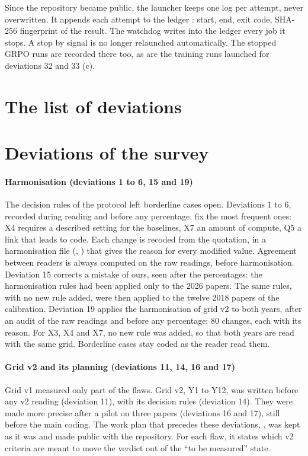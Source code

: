 Since the repository became public, the launcher  keeps one log per attempt, never overwritten. It
appends each attempt to the ledger : start, end, exit code, SHA-256
fingerprint of the result. The watchdog writes into the ledger every job it stops. A stop by signal
is no longer relaunched automatically. The stopped GRPO runs are recorded there too, as are the
training runs launched for deviations 32 and 33 (c).

\section{The list of deviations}
\label{sec:liste-ecarts}


\section{Deviations of the survey}
\label{sec:ecarts-sondage}

\paragraph{Harmonisation (deviations 1 to 6, 15 and 19)} The decision rules of the protocol left
borderline cases open. Deviations 1 to 6, recorded during reading and before any percentage, fix
the most frequent ones: X4 requires a described setting for the baselines, X7 an amount of compute,
Q5 a link that leads to code. Each change is recoded from the quotation, in a harmonisation file
(, ) that gives the reason for every modified value.
Agreement between readers is always computed on the raw readings, before harmonisation. Deviation 15
corrects a mistake of ours, seen after the percentages: the harmonisation rules had been applied
only to the 2026 papers. The same rules, with no new rule added, were then applied to the twelve
2018 papers of the calibration. Deviation 19 applies the harmonisation of grid v2 to both years,
after an audit of the raw readings and before any percentage: 80 changes, each with its reason. For
X3, X4 and X7, no new rule was added, so that both years are read with the same grid. Borderline
cases stay coded as the reader read them.

\paragraph{Grid v2 and its planning (deviations 11, 14, 16 and 17)} Grid v1 measured only part of the
flaws. Grid v2, Y1 to Y12, was written before any v2 reading (deviation 11), with its
decision rules (deviation 14). They were made more precise after a pilot on three papers
(deviations 16 and 17), still before the main coding. The work plan that precedes these deviations,
, was kept as it was and made public with the repository. For each
flaw, it states which v2 criteria are meant to move the verdict out of the \enquote{to be measured}
state.


